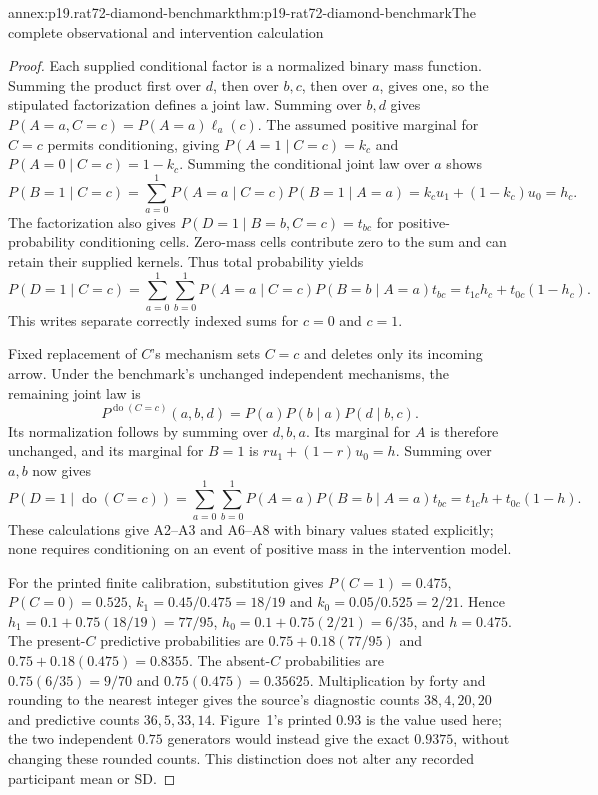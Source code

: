 \begin{annexitem}{annex:p19.rat72-diamond-benchmark}{thm:p19-rat72-diamond-benchmark}{The complete observational and intervention calculation}
\begin{proof}
Each supplied conditional factor is a normalized binary mass function.
Summing the product first over \(d\), then over \(b,c\), then over
\(a\), gives one, so the stipulated factorization defines a joint law.
Summing over \(b,d\) gives
\(P(A=a,C=c)=P(A=a)\ell_a(c)\). The assumed positive marginal for
\(C=c\) permits conditioning, giving \(P(A=1\mid C=c)=k_c\)
and \(P(A=0\mid C=c)=1-k_c\). Summing the conditional joint law
over \(a\) shows
\[
 P(B=1\mid C=c)=\sum_{a=0}^1P(A=a\mid C=c)P(B=1\mid A=a)
 =k_cu_1+(1-k_c)u_0=h_c.
\]
The factorization also gives
\(P(D=1\mid B=b,C=c)=t_{bc}\) for positive-probability conditioning
cells. Zero-mass cells contribute zero to the sum and can retain their
supplied kernels. Thus total probability yields
\[
 P(D=1\mid C=c)
 =\sum_{a=0}^1\sum_{b=0}^1
 P(A=a\mid C=c)P(B=b\mid A=a)t_{bc}
 =t_{1c}h_c+t_{0c}(1-h_c).
\]
This writes separate correctly indexed sums for \(c=0\) and \(c=1\).

Fixed replacement of \(C\)'s mechanism sets \(C=c\) and deletes
only its incoming arrow. Under the benchmark's unchanged independent
mechanisms, the remaining joint law is
\[
 P^{\operatorname{do}(C=c)}(a,b,d)=P(a)P(b\mid a)P(d\mid b,c).
\]
Its normalization follows by summing over \(d,b,a\). Its marginal
for \(A\) is therefore unchanged, and its marginal for \(B=1\) is
\(ru_1+(1-r)u_0=h\). Summing over \(a,b\) now gives
\[
 P(D=1\mid\operatorname{do}(C=c))
 =\sum_{a=0}^1\sum_{b=0}^1P(A=a)P(B=b\mid A=a)t_{bc}
 =t_{1c}h+t_{0c}(1-h).
\]
These calculations give A2--A3 and A6--A8 with binary values stated
explicitly; none requires conditioning on an event of positive mass
in the intervention model.

For the printed finite calibration, substitution gives
\(P(C=1)=0.475\), \(P(C=0)=0.525\),
\(k_1=0.45/0.475=18/19\) and
\(k_0=0.05/0.525=2/21\). Hence
\(h_1=0.1+0.75(18/19)=77/95\),
\(h_0=0.1+0.75(2/21)=6/35\), and \(h=0.475\).
The present-\(C\) predictive probabilities are
\(0.75+0.18(77/95)\) and \(0.75+0.18(0.475)=0.8355\).
The absent-\(C\) probabilities are
\(0.75(6/35)=9/70\) and \(0.75(0.475)=0.35625\).
Multiplication by forty and rounding to the nearest integer gives
the source's diagnostic counts \(38,4,20,20\) and predictive counts
\(36,5,33,14\). Figure~1's printed \(0.93\) is the value used here;
the two independent \(0.75\) generators would instead give the exact
\(0.9375\), without changing these rounded counts. This distinction
does not alter any recorded participant mean or SD.
\end{proof}
\end{annexitem}
